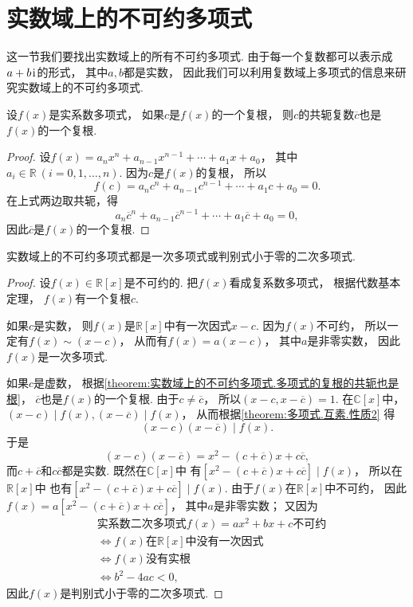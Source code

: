 \section{实数域上的不可约多项式}
这一节我们要找出实数域上的所有不可约多项式.
由于每一个复数都可以表示成\(a+b\kern1pt\mathrm{i}\kern1pt\)的形式，
其中\(a,b\)都是实数，
因此我们可以利用复数域上多项式的信息来研究实数域上的不可约多项式.

\begin{theorem}\label{theorem:实数域上的不可约多项式.多项式的复根的共轭也是根}
设\(f(x)\)是实系数多项式，
如果\(c\)是\(f(x)\)的一个复根，
则\(c\)的共轭复数\(\overline{c}\)也是\(f(x)\)的一个复根.
\begin{proof}
设\(f(x)=a_n x^n+a_{n-1} x^{n-1}+\dotsb+a_1 x+a_0\)，
其中\(a_i\in\mathbb{R}\ (i=0,1,\dotsc,n)\).
因为\(c\)是\(f(x)\)的复根，
所以\[
	f(c)=a_n c^n+a_{n-1} c^{n-1}+\dotsb+a_1 c+a_0=0.
\]
在上式两边取共轭，得\[
	a_n \overline{c}^n+a_{n-1} \overline{c}^{n-1}+\dotsb+a_1 \overline{c}+a_0=0,
\]
因此\(\overline{c}\)是\(f(x)\)的一个复根.
\end{proof}
\end{theorem}

\begin{theorem}\label{theorem:实数域上的不可约多项式.实数域上的不可约多项式}
实数域上的不可约多项式都是一次多项式或判别式小于零的二次多项式.
\begin{proof}
设\(f(x)\in\mathbb{R}[x]\)是不可约的.
把\(f(x)\)看成复系数多项式，
根据代数基本定理，
\(f(x)\)有一个复根\(c\).

如果\(c\)是实数，
则\(f(x)\)是\(\mathbb{R}[x]\)中有一次因式\(x-c\).
因为\(f(x)\)不可约，
所以一定有\(f(x) \sim (x-c)\)，
从而有\(f(x)=a(x-c)\)，
其中\(a\)是非零实数，
因此\(f(x)\)是一次多项式.

如果\(c\)是虚数，
根据\cref{theorem:实数域上的不可约多项式.多项式的复根的共轭也是根}，
\(\overline{c}\)也是\(f(x)\)的一个复根.
由于\(c\neq\overline{c}\)，
所以\((x-c,x-\overline{c})=1\).
在\(\mathbb{C}[x]\)中，
\((x-c) \mid f(x),
(x-\overline{c}) \mid f(x)\)，
从而根据\cref{theorem:多项式.互素.性质2} 得\[
	(x-c)(x-\overline{c}) \mid f(x).
\]
于是\[
	(x-c)(x-\overline{c})
	=x^2-(c+\overline{c})x+c\overline{c},
\]
而\(c+\overline{c}\)和\(c\overline{c}\)都是实数.
既然在\(\mathbb{C}[x]\)中
有\([x^2-(c+\overline{c})x+c\overline{c}] \mid f(x)\)，
所以在\(\mathbb{R}[x]\)中
也有\([x^2-(c+\overline{c})x+c\overline{c}] \mid f(x)\).
由于\(f(x)\)在\(\mathbb{R}[x]\)中不可约，
因此\(f(x)=a[x^2-(c+\overline{c})x+c\overline{c}]\)，
其中\(a\)是非零实数；
又因为\begin{align*}
	&\text{实系数二次多项式$f(x)=ax^2+bx+c$不可约} \\
	&\iff \text{$f(x)$在$\mathbb{R}[x]$中没有一次因式} \\
	&\iff \text{$f(x)$没有实根} \\
	&\iff b^2-4ac<0,
\end{align*}
因此\(f(x)\)是判别式小于零的二次多项式.
\end{proof}
\end{theorem}


